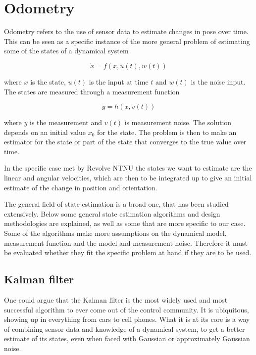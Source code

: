 \section{Odometry}

Odometry refers to the use of sensor data to estimate changes in pose over time. This can be seen as a specific instance of the more general problem of estimating some of the states of a dynamical system 

\begin{equation}
    \Dot{x} = f(x,u(t), w(t))
\end{equation}

where $x$ is the state, $u(t)$ is the input at time $t$ and $w(t)$ is the noise input. The states are measured through a measurement function

\begin{equation}
    y = h(x,v(t))
\end{equation}

where $y$ is the measurement and $v(t)$ is measurement noise. The solution depends on an initial value $x_0$ for the state. The problem is then to make an estimator for the state or part of the state that converges to the true value over time.

In the specific case met by Revolve NTNU the states we want to estimate are the linear and angular velocities, which are then to be integrated up to give an initial estimate of the change in position and orientation.

The general field of state estimation is a broad one, that has been studied extensively. Below some general state estimation algorithms and design methodologies are explained, as well as some that are more specific to our case. Some of the algorithms make more assumptions on the dynamical model, measurement function and the model and measurement noise. Therefore it must be evaluated whether they fit the specific problem at hand if they are to be used. 

\subsection{Kalman filter}

One could argue that the Kalman filter is the most widely used and most successful algorithm to ever come out of the control community. It is ubiquitous, showing up in everything from cars to cell phones. What it is at its core is a way of combining sensor data and knowledge of a dynamical system, to get a better estimate of its states, even when faced with Gaussian or approximately Gaussian noise. 

